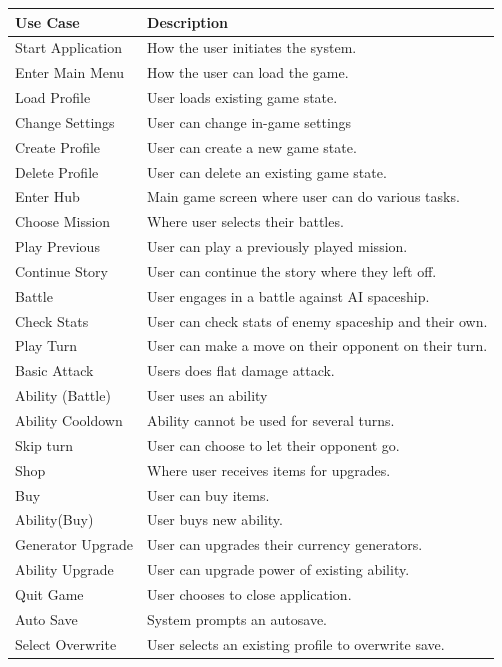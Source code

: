 \documentclass[]{article}
\begin{document}
\begin{center}
\begin{tabular}{ |p{5cm}|p{9cm}| } 
\hline
\textbf{Use Case} & \textbf{Description} \\ 
 \hline
Start Application & How the user initiates the system.\\
 \hline
Enter Main Menu & How the user can load the game.\\
\hline
Load Profile & User loads existing game state.\\
\hline
Change Settings & User can change in-game settings\\
\hline
Create Profile & User can create a new game state.\\
\hline
Delete Profile & User can delete an existing game state.\\
\hline
Enter Hub & Main game screen where user can do various tasks.\\
\hline
Choose Mission & Where user selects their battles.\\
\hline
Play Previous & User can play a previously played mission.\\
\hline
Continue Story & User can continue the story where they left off.\\
\hline
Battle & User engages in a battle against AI spaceship.\\
\hline
Check Stats & User can check stats of enemy spaceship and their own.\\
\hline
Play Turn & User can make a move on their opponent on their turn.\\
\hline
Basic Attack & Users does flat damage attack.\\
\hline
Ability (Battle) & User uses an ability\\
\hline
Ability Cooldown & Ability cannot be used for several turns.\\
\hline
Skip turn & User can choose to let their opponent go.\\
\hline
Shop & Where user receives items for upgrades.\\
\hline
Buy & User can buy items.\\
\hline
Ability(Buy) & User buys new ability.\\
\hline
Generator Upgrade & User can upgrades their currency generators.\\
\hline
Ability Upgrade & User can upgrade power of existing ability.\\
\hline
Quit Game & User chooses to close application.\\
\hline
Auto Save & System prompts an autosave.\\
\hline
Select Overwrite & User selects an existing profile to overwrite save.\\
\hline
\end{tabular}
\end{center}
\end{document}
